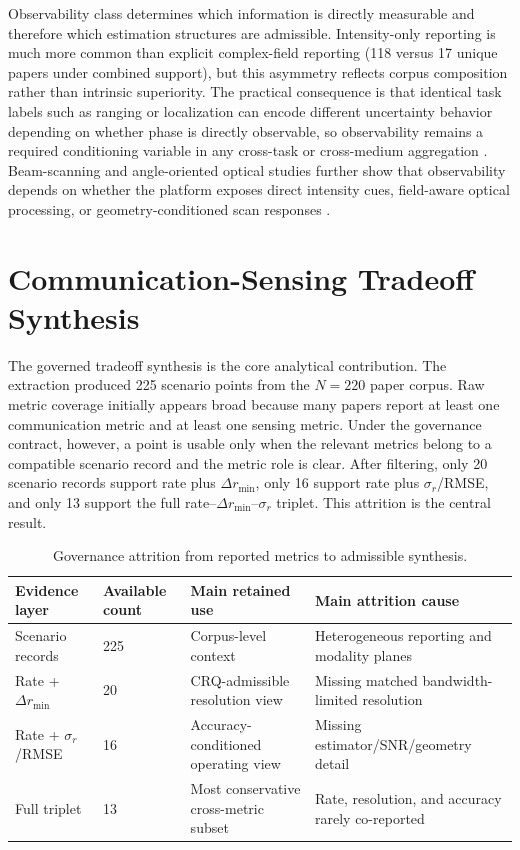 \documentclass[letterpaper,journal]{IEEEtran}
\begin{document}
Observability class determines which information is directly measurable and therefore which estimation structures are admissible. Intensity-only reporting is much more common than explicit complex-field reporting (118 versus 17 unique papers under combined support), but this asymmetry reflects corpus composition rather than intrinsic superiority. The practical consequence is that identical task labels such as ranging or localization can encode different uncertainty behavior depending on whether phase is directly observable, so observability remains a required conditioning variable in any cross-task or cross-medium aggregation . Beam-scanning and angle-oriented optical studies further show that observability depends on whether the platform exposes direct intensity cues, field-aware optical processing, or geometry-conditioned scan responses .

\section{Communication-Sensing Tradeoff Synthesis}
\label{sec:tradeoff}

The governed tradeoff synthesis is the core analytical contribution. The extraction produced 225 scenario points from the \(N=220\) paper corpus. Raw metric coverage initially appears broad because many papers report at least one communication metric and at least one sensing metric. Under the governance contract, however, a point is usable only when the relevant metrics belong to a compatible scenario record and the metric role is clear. After filtering, only 20 scenario records support rate plus \(\Delta r_{\min}\), only 16 support rate plus \(\sigma_r\)/RMSE, and only 13 support the full rate--\(\Delta r_{\min}\)--\(\sigma_r\) triplet. This attrition is the central result.

\begin{table}[!t]
    \caption{Governance attrition from reported metrics to admissible synthesis.}
    \label{tab:governance_attrition}
    \centering
    \scriptsize
    \setlength{\tabcolsep}{3pt}
    \renewcommand{\arraystretch}{1.08}
    \begin{tabularx}{\textwidth}{@{}p{2.8cm}p{2.0cm}p{2.2cm}X@{}}
        \toprule
        Evidence layer & Available count & Main retained use & Main attrition cause \\
        \midrule
        Scenario records & 225 & Corpus-level context & Heterogeneous reporting and modality planes \\
        Rate + $\Delta r_{\min}$ & 20 & CRQ-admissible resolution view & Missing matched bandwidth-limited resolution \\
        Rate + $\sigma_r$/RMSE & 16 & Accuracy-conditioned operating view & Missing estimator/SNR/geometry detail \\
        Full triplet & 13 & Most conservative cross-metric subset & Rate, resolution, and accuracy rarely co-reported \\
        \bottomrule
    \end{tabularx}
\end{table}
\end{document}
